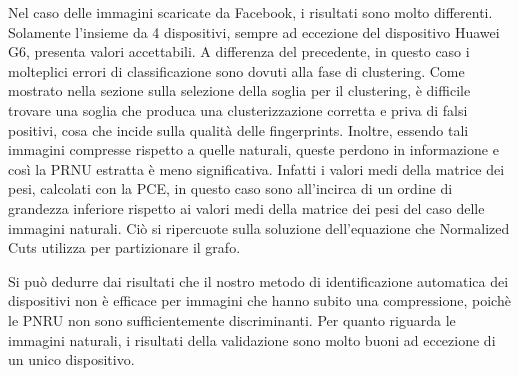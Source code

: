 Nel caso delle immagini scaricate da Facebook, i risultati sono molto differenti. Solamente l'insieme da 4 dispositivi, sempre ad eccezione del dispositivo Huawei G6, presenta valori accettabili. A differenza del precedente, in questo caso i molteplici errori di classificazione sono dovuti alla fase di clustering. Come mostrato nella sezione sulla selezione della soglia per il clustering, è difficile trovare una soglia che produca una clusterizzazione corretta e priva di falsi positivi, cosa che incide sulla qualità delle fingerprints. Inoltre, essendo tali immagini compresse rispetto a quelle naturali, queste perdono in informazione e così la PRNU estratta è meno significativa. Infatti i valori medi della matrice dei pesi, calcolati con la PCE,  in questo caso sono all'incirca di un ordine di grandezza inferiore rispetto ai valori medi della matrice dei pesi del caso delle immagini naturali. Ciò si ripercuote sulla soluzione dell'equazione che Normalized Cuts utilizza per partizionare il grafo.

Si può dedurre dai risultati che il nostro metodo di identificazione automatica dei dispositivi non è efficace per immagini che hanno subito una compressione, poichè le PNRU non sono sufficientemente discriminanti. Per quanto riguarda le immagini naturali, i risultati della validazione sono molto buoni ad eccezione di un unico dispositivo.